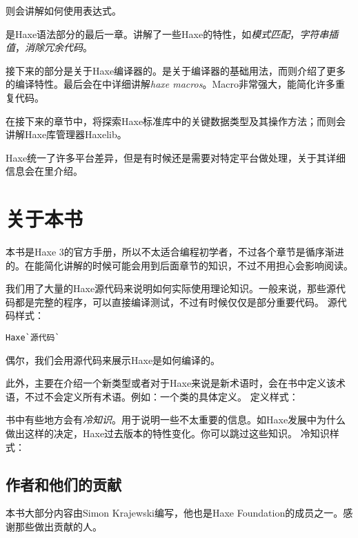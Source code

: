则会讲解如何使用表达式。

是Haxe语法部分的最后一章。讲解了一些Haxe的特性，如\emph{模式匹配}，\emph{字符串插值}，\emph{消除冗余代码}。

接下来的部分是关于Haxe编译器的。是关于编译器的基础用法，而则介绍了更多的编译特性。最后会在中详细讲解\emph{haxe macros}。Macro非常强大，能简化许多重复代码。

在接下来的章节中，将探索Haxe标准库中的关键数据类型及其操作方法；而则会讲解Haxe库管理器Haxelib。

Haxe统一了许多平台差异，但是有时候还是需要对特定平台做处理，关于其详细信息会在里介绍。

\section{关于本书}
\label{introduction-about-this-document}

本书是Haxe 3的官方手册，所以不太适合编程初学者，不过各个章节是循序渐进的。在能简化讲解的时候可能会用到后面章节的知识，不过不用担心会影响阅读。

我们用了大量的Haxe源代码来说明如何实际使用理论知识。一般来说，那些源代码都是完整的程序，可以直接编译测试，不过有时候仅仅是部分重要代码。
源代码样式：

\begin{lstlisting}
Haxe`源代码`
\end{lstlisting}
偶尔，我们会用源代码来展示Haxe是如何编译的。

此外，主要在介绍一个新类型或者对于Haxe来说是新术语时，会在书中定义该术语，不过不会定义所有术语。例如：一个类的具体定义。
定义样式：


书中有些地方会有\emph{冷知识}。用于说明一些不太重要的信息。如Haxe发展中为什么做出这样的决定，Haxe过去版本的特性变化。你可以跳过这些知识。
冷知识样式：


\subsection{作者和他们的贡献}
\label{introduction-authors-and-contributions}

本书大部分内容由Simon Krajewski编写，他也是Haxe Foundation的成员之一。感谢那些做出贡献的人。

